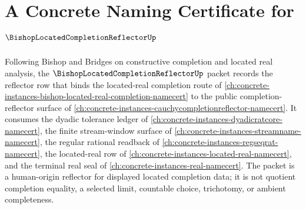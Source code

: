 \chapter{A Concrete Naming Certificate for $\BishopLocatedCompletionReflectorUp$}
\label{ch:concrete-instances-bishop-located-completion-reflector-namecert}

Following Bishop and Bridges on constructive completion and located real analysis, the $\BishopLocatedCompletionReflectorUp$ packet records the reflector row that binds the located-real completion route of \autoref{ch:concrete-instances-bishop-located-real-completion-namecert} to the public completion-reflector surface of \autoref{ch:concrete-instances-cauchycompletionreflector-namecert}. It consumes the dyadic tolerance ledger of \autoref{ch:concrete-instances-dyadicratcore-namecert}, the finite stream-window surface of \autoref{ch:concrete-instances-streamname-namecert}, the regular rational readback of \autoref{ch:concrete-instances-regseqrat-namecert}, the located-real row of \autoref{ch:concrete-instances-located-real-namecert}, and the terminal real seal of \autoref{ch:concrete-instances-real-namecert}. The packet is a human-origin reflector for displayed located completion data; it is not quotient completion equality, a selected limit, countable choice, trichotomy, or ambient completeness.

